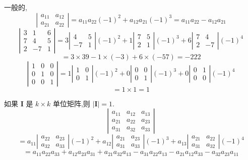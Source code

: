 
一般的,
\[
\left|\begin{matrix} a_{11} & a_{12} \\ a_{21} & a_{22} \end{matrix}\right| = a_{11}a_{22}(-1)^2 + a_{12}a_{21}(-1)^3 = a_{11}a_{22} - a_{12}a_{21}
\]
\[
\left|\begin{matrix} 3 & 1 & 6 \\ 7 & 4 & 5 \\ 2 & -7 & 1 \end{matrix}\right|
= 3\left|\begin{matrix} 4 & 5 \\ -7 & 1 \end{matrix}\right|(-1)^2
+ 1\left|\begin{matrix} 7 & 5 \\ 2 & 1 \end{matrix}\right|(-1)^3
+ 6\left|\begin{matrix} 7 & 4 \\ 2 & -7 \end{matrix}\right|(-1)^4
\]
\[
= 3\times39 - 1\times(-3) + 6\times(-57) = -222
\]
\[
\left|\begin{matrix} 1 & 0 & 0 \\ 0 & 1 & 0 \\ 0 & 0 & 1 \end{matrix}\right|
= 1\left|\begin{matrix} 1 & 0 \\ 0 & 1 \end{matrix}\right|(-1)^2
+ 0\left|\begin{matrix} 0 & 0 \\ 0 & 1 \end{matrix}\right|(-1)^3
+ 0\left|\begin{matrix} 0 & 1 \\ 0 & 0 \end{matrix}\right|(-1)^4
\]
\[
= 1\times1 = 1
\]

如果 $\bm{I}$ 是 $k\times k$ 单位矩阵,则 $|\bm{I}| = 1$.
\[
\left|\begin{matrix} a_{11} & a_{12} & a_{13} \\ a_{21} & a_{22} & a_{23} \\ a_{31} & a_{32} & a_{33} \end{matrix}\right|
\]
\[
= a_{11}\left|\begin{matrix} a_{22} & a_{23} \\ a_{32} & a_{33} \end{matrix}\right|(-1)^2
+ a_{12}\left|\begin{matrix} a_{21} & a_{23} \\ a_{31} & a_{33} \end{matrix}\right|(-1)^3
+ a_{13}\left|\begin{matrix} a_{21} & a_{22} \\ a_{31} & a_{32} \end{matrix}\right|(-1)^4
\]
\[
= a_{11}a_{22}a_{33} + a_{12}a_{23}a_{31} + a_{21}a_{32}a_{13} - a_{31}a_{22}a_{13} - a_{21}a_{12}a_{33} - a_{32}a_{23}a_{11}
\]

